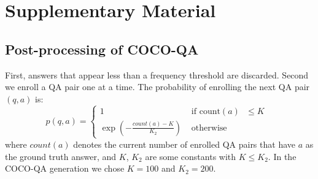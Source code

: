 \documentclass{article} %
\renewcommand{\#}[1]{\textbf{#1}}
\begin{document}
\begin{small}


\end{small}

\clearpage
\appendix
\section{Supplementary Material}
\subsection{Post-processing of COCO-QA}
\label{app:post_process}
First, answers that appear less than a frequency threshold are discarded. 
Second we enroll a QA pair one at a time. 
The probability of enrolling the next QA pair $(q, a)$ is:
\begin{equation}
p(q, a) = \left\{ \begin{array}{cl}
1 &\mbox{ if count$(a)$ $\le K$ } \\
\exp\left(-\frac{count(a) - K}{K_2}\right) &\mbox{ otherwise }
\end{array} \right.
\end{equation}
where $count(a)$ denotes the current number of enrolled QA pairs that have $a$
as the ground truth answer, and $K$, $K_2$ are some constants with $K \le
K_2$. In the COCO-QA generation we chose $K = 100$ and $K_2 = 200$. 
\end{document}
